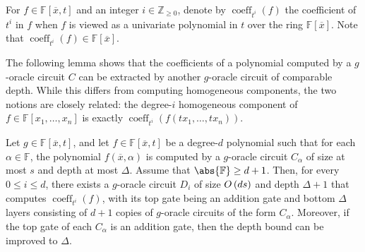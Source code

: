 \documentclass[10pt,a4paper]{amsart}
\DeclareMathOperator{\coeff}{coeff}
\newcommand*\Z{\mathbb{Z}}
\newcommand*\F{\mathbb{F}}
\newcommand*\bigO[1]{%
    O\kern-0.0pt\left(#1\right)
}
\begin{document}
\begin{defn}\label{defn:coeff}
For $f\in \F[\overline{x}, t]$ and an integer $i\in\Z_{\geq 0}$, denote by $\coeff_{t^i}(f)$ the coefficient of $t^i$ in $f$ when $f$ is viewed as a univariate polynomial in $t$ over the ring $\F[\overline{x}]$.
Note that $\coeff_{t^i}(f)\in \F[\overline{x}]$.
\end{defn}
The following lemma shows that the coefficients of a polynomial computed by a $g$-oracle circuit $C$ can be extracted by another $g$-oracle circuit of comparable depth. 
While this differs from computing homogeneous components, the two notions are closely related: the degree-$i$ homogeneous component of $f \in \F[x_1,\dots,x_n]$ is exactly $\coeff_{t^i}(f(tx_1,\dots,tx_n))$.
\begin{lem}\label{lem:homogenization}
Let $g \in \F[\overline{x},t]$, and let $f \in \F[\overline{x},t]$ be a degree-$d$ polynomial such that for each $\alpha \in \F$, the polynomial $f(\overline{x},\alpha)$ is computed by a $g$-oracle circuit $C_\alpha$ of size at most $s$ and depth at most $\Delta$.
Assume that $\abs{\F} \geq d + 1$.
Then, for every $0 \leq i \leq d$, there exists a $g$-oracle circuit $D_i$ of size $\bigO{ds}$ and depth $\Delta+1$ that computes $\coeff_{t^i}(f)$, with its top gate being an addition gate and bottom $\Delta$ layers consisting of $d+1$ copies of $g$-oracle circuits of the form $C_\alpha$.
Moreover, if the top gate of each $C_\alpha$ is an addition gate, then the depth bound can be improved to $\Delta$.
\end{lem}
\end{document}

